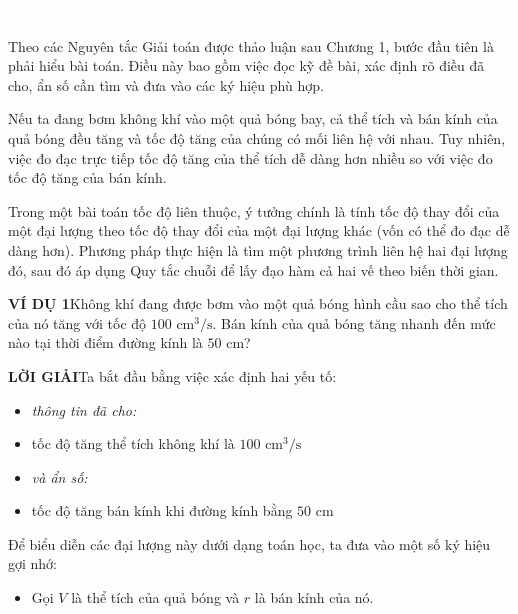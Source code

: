\noindent
\begin{minipage}[t]{0.23\textwidth}
  \vspace{115pt}
  \begin{tcolorbox}[
    colback=lightgreenbg!60!gray!15,
    colframe=lightgreenbg!60!gray!15,
    arc=0mm, boxrule=0pt, left=4pt, right=4pt, top=4pt, bottom=4pt
  ]
    \begin{minipage}{14pt}
      \colorbox{pspurple}{\textcolor{white}{\footnotesize\bfseries PS}}
    \end{minipage}%
    \begin{minipage}{\linewidth-16pt}
      \scriptsize\raggedright
      Theo các Nguyên tắc Giải toán được thảo luận sau Chương 1, bước đầu tiên là phải hiểu bài toán. Điều này bao gồm việc đọc kỹ đề bài, xác định rõ điều đã cho, ẩn số cần tìm và đưa vào các ký hiệu phù hợp.
    \end{minipage}
  \end{tcolorbox}
\end{minipage}%
\hfill
\begin{minipage}[t]{0.74\textwidth}
  \fontsize{9.3pt}{12.5pt}\selectfont
  Nếu ta đang bơm không khí vào một quả bóng bay, cả thể tích và bán kính của quả bóng đều tăng và tốc độ tăng của chúng có mối liên hệ với nhau. Tuy nhiên, việc đo đạc trực tiếp tốc độ tăng của thể tích dễ dàng hơn nhiều so với việc đo tốc độ tăng của bán kính.

  Trong một bài toán tốc độ liên thuộc, ý tưởng chính là tính tốc độ thay đổi của một đại lượng theo tốc độ thay đổi của một đại lượng khác (vốn có thể đo đạc dễ dàng hơn). Phương pháp thực hiện là tìm một phương trình liên hệ hai đại lượng đó, sau đó áp dụng Quy tắc chuỗi để lấy đạo hàm cả hai vế theo biến thời gian.

  \vspace{5pt}
  {\bfseries\color{stewartblue}VÍ DỤ 1}\quad Không khí đang được bơm vào một quả bóng hình cầu sao cho thể tích của nó tăng với tốc độ $100\text{ cm}^3/\text{s}$. Bán kính của quả bóng tăng nhanh đến mức nào tại thời điểm đường kính là $50\text{ cm}$?

  \vspace{3pt}
  {\bfseries\color{stewartblue}LỜI GIẢI}\quad Ta bắt đầu bằng việc xác định hai yếu tố:
  \begin{itemize}[leftmargin=35pt, itemsep=1pt, topsep=1pt]
    \item[] \textit{thông tin đã cho:}
    \item[] \hspace{20pt} tốc độ tăng thể tích không khí là $100\text{ cm}^3/\text{s}$
    \item[] \textit{và ẩn số:}
    \item[] \hspace{20pt} tốc độ tăng bán kính khi đường kính bằng $50\text{ cm}$
  \end{itemize}
  Để biểu diễn các đại lượng này dưới dạng toán học, ta đưa vào một số ký hiệu gợi nhớ:
  \begin{itemize}[leftmargin=35pt, itemsep=1pt, topsep=1pt]
    \item[] Gọi $V$ là thể tích của quả bóng và $r$ là bán kính của nó.
  \end{itemize}
\end{minipage}
